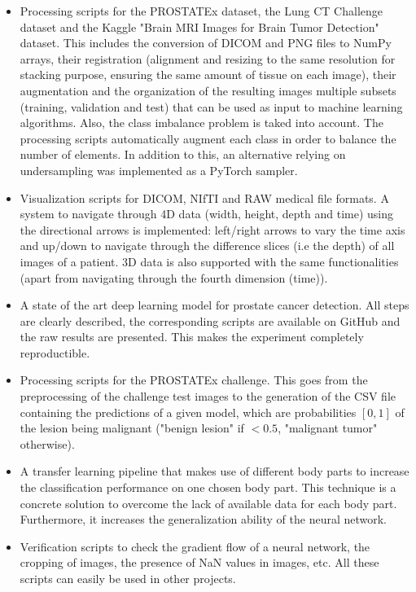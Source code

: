 \begin{itemize}

\item Processing scripts for the PROSTATEx dataset, the Lung CT Challenge dataset and the Kaggle "Brain MRI Images for Brain Tumor Detection" dataset. This includes the conversion of DICOM and PNG files to NumPy arrays, their registration (alignment and resizing to the same resolution for stacking purpose, ensuring the same amount of tissue on each image), their augmentation and the organization of the resulting images multiple subsets (training, validation and test) that can be used as input to machine learning algorithms. Also, the class imbalance problem is taked into account. The processing scripts automatically augment each class in order to balance the number of elements. In addition to this, an alternative relying on undersampling was implemented as a PyTorch sampler.

\item Visualization scripts for DICOM, NIfTI and RAW medical file formats. A system to navigate through 4D data (width, height, depth and time) using the directional arrows is implemented: left/right arrows to vary the time axis and up/down to navigate through the difference slices (i.e the depth) of all images of a patient. 3D data is also supported with the same functionalities (apart from navigating through the fourth dimension (time)). 

\item A state of the art deep learning model for prostate cancer detection. All steps are clearly described, the corresponding scripts are available on GitHub and the raw results are presented. This makes the experiment completely reproductible. 

\item Processing scripts for the PROSTATEx challenge. This goes from the preprocessing of the challenge test images to the generation of the CSV file containing the predictions of a given model, which are probabilities $[0,1]$ of the lesion being malignant ("benign lesion" if $< 0.5$, "malignant tumor" otherwise).

\item A transfer learning pipeline that makes use of different body parts to increase the classification performance on one chosen body part. This technique is a concrete solution to overcome the lack of available data for each body part. Furthermore, it increases the generalization ability of the neural network.

\item Verification scripts to check the gradient flow of a neural network, the cropping of images, the presence of NaN values in images, etc. All these scripts can easily be used in other projects.
\end{itemize}